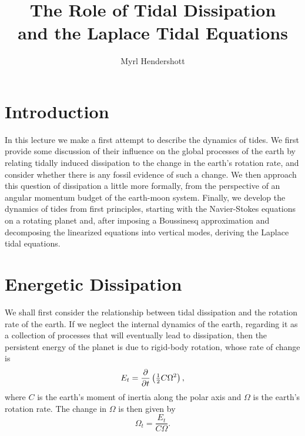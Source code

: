 \documentclass[11pt]{article}
\title{The Role of Tidal Dissipation \\ and the Laplace Tidal Equations}
\author{Myrl Hendershott}
\begin{document}
\maketitle


\section{Introduction}
\label{Intro}

In this lecture we make a first attempt to describe the dynamics of tides. We first provide some discussion of their influence on the global processes of the earth by relating tidally induced dissipation to the change in the earth's rotation rate, and consider whether there is any fossil evidence of such a change. We then approach this question of dissipation a little more formally, from the perspective of an angular momentum budget of the earth-moon system. Finally, we develop the dynamics of tides from first principles, starting with the Navier-Stokes equations on a rotating planet and, after imposing a Boussinesq approximation and decomposing the linearized equations into vertical modes, deriving the Laplace tidal equations.


\section{Energetic Dissipation}
\label{EnergyDissipation}


We shall first consider the relationship between tidal dissipation and the rotation rate of the earth. If we neglect the internal dynamics of the earth, regarding it as a collection of processes that will eventually lead to dissipation, then the persistent energy of the planet is due to rigid-body rotation, whose rate of change is
\begin{equation}
E_t = \frac{\partial }{\partial t} \left(\tfrac{1}{2} C \Omega^2 \right),
\end{equation}
where $C$ is the earth's moment of inertia along the polar axis and $\Omega$ is the earth's rotation rate. The change in $\Omega$ is then given by
\begin{equation}
\label{EarthRotationRate}
\Omega_t = \frac{E_t}{C \Omega}.
\end{equation}
\end{document}
